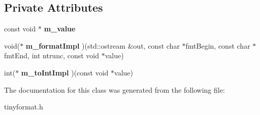 \subsection*{Private Attributes}
\begin{DoxyCompactItemize}
\item 
\mbox{\label{classtinyformat_1_1detail_1_1FormatArg_ad7630a7d1e68ac56e46e03722156056a}} 
const void $\ast$ {\bfseries m\+\_\+value}
\item 
\mbox{\label{classtinyformat_1_1detail_1_1FormatArg_a3e1114e7a277020906bfd4588ff9b6fc}} 
void($\ast$ {\bfseries m\+\_\+format\+Impl} )(std\+::ostream \&out, const char $\ast$fmt\+Begin, const char $\ast$fmt\+End, int ntrunc, const void $\ast$value)
\item 
\mbox{\label{classtinyformat_1_1detail_1_1FormatArg_a999e592d6235d5dbdf0f46cad769f220}} 
int($\ast$ {\bfseries m\+\_\+to\+Int\+Impl} )(const void $\ast$value)
\end{DoxyCompactItemize}


The documentation for this class was generated from the following file\+:\begin{DoxyCompactItemize}
\item 
tinyformat.\+h\end{DoxyCompactItemize}
